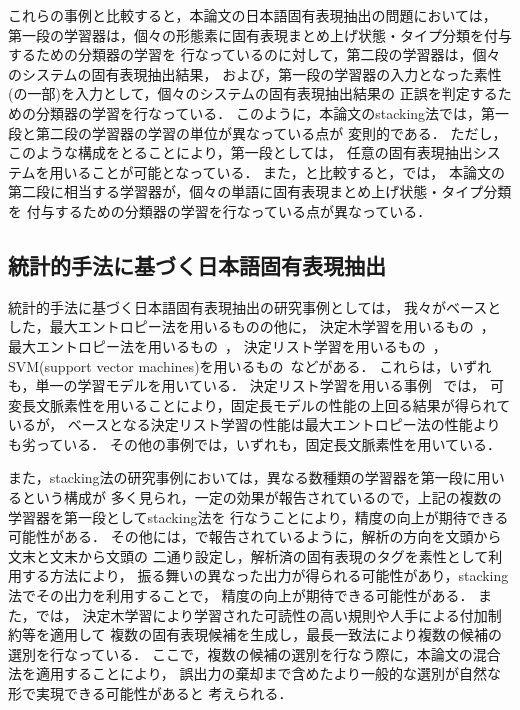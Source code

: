 これらの事例と比較すると，本論文の日本語固有表現抽出の問題においては，
第一段の学習器は，個々の形態素に固有表現まとめ上げ状態・タイプ分類を付与するための分類器の学習を
行なっているのに対して，第二段の学習器は，個々のシステムの固有表現抽出結果，
および，第一段の学習器の入力となった素性(の一部)を入力として，個々のシステムの固有表現抽出結果の
正誤を判定するための分類器の学習を行なっている．
このように，本論文のstacking法では，第一段と第二段の学習器の学習の単位が異なっている点が
変則的である．
ただし，このような構成をとることにより，第一段としては，
任意の固有表現抽出システムを用いることが可能となっている．
また，\cite{Borthwick98a}と比較すると，\cite{Borthwick98a}では，
本論文の第二段に相当する学習器が，個々の単語に固有表現まとめ上げ状態・タイプ分類を
付与するための分類器の学習を行なっている点が異なっている．


\subsection{統計的手法に基づく日本語固有表現抽出}

統計的手法に基づく日本語固有表現抽出の研究事例としては，
我々がベースとした，最大エントロピー法を用いるもの\cite{Uchimoto00aj}の他に，
決定木学習を用いるもの~\cite{Sekine98a,Nobata99aj}，
最大エントロピー法を用いるもの~\cite{Borthwick99aj}，
決定リスト学習を用いるもの~\cite{Sassano00a}， 
SVM(support vector machines)を用いるもの~\cite{Yamada01ajx}などがある．
これらは，いずれも，単一の学習モデルを用いている．
決定リスト学習を用いる事例~\cite{Sassano00a} 
では，
可変長文脈素性を用いることにより，固定長モデルの性能の上回る結果が得られているが，
ベースとなる決定リスト学習の性能は最大エントロピー法の性能よりも劣っている．
その他の事例では，いずれも，固定長文脈素性を用いている．

また，stacking法の研究事例においては，異なる数種類の学習器を第一段に用いるという構成が
多く見られ，一定の効果が報告されているので，上記の複数の学習器を第一段としてstacking法を
行なうことにより，精度の向上が期待できる可能性がある．
その他には，\cite{Yamada01ajx}で報告されているように，解析の方向を文頭から文末と文末から文頭の
二通り設定し，解析済の固有表現のタグを素性として利用する方法により，
振る舞いの異なった出力が得られる可能性があり，stacking法でその出力を利用することで，
精度の向上が期待できる可能性がある．
また，\cite{Isozaki00ajx}では，
決定木学習により学習された可読性の高い規則や人手による付加制約等を適用して
複数の固有表現候補を生成し，最長一致法により複数の候補の選別を行なっている．
ここで，複数の候補の選別を行なう際に，本論文の混合法を適用することにより，
誤出力の棄却まで含めたより一般的な選別が自然な形で実現できる可能性があると
考えられる．

